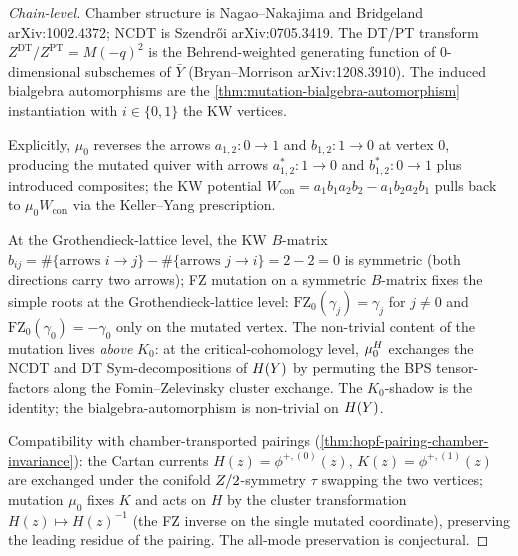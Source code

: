 \begin{proof}[Chain-level]
  Chamber structure is Nagao--Nakajima \cite[Thm 3.5, \S 4]{NagaoNakajima2011}
  and Bridgeland \cite[Thm 1.2]{Bridgeland2011} arXiv:1002.4372; NCDT is
  Szendr\H{o}i \cite{Szendroi2008} arXiv:0705.3419. The DT/PT transform
  $Z^{\mathrm{DT}}/Z^{\mathrm{PT}} = M(-q)^2$ is the Behrend-weighted generating
  function of $0$-dimensional subschemes of $\bar{Y}$
  (Bryan--Morrison \cite{BryanMorrison2012} arXiv:1208.3910). The
  induced bialgebra automorphisms are the
  \cref{thm:mutation-bialgebra-automorphism} instantiation with
  $i \in \{0, 1\}$ the KW vertices.

  Explicitly, $\mu_0$ reverses the arrows $a_{1,2}\colon 0 \to 1$ and
  $b_{1,2}\colon 1 \to 0$ at vertex $0$, producing the mutated quiver
  with arrows $a_{1,2}^*\colon 1 \to 0$ and $b_{1,2}^*\colon 0 \to 1$
  plus introduced composites; the KW potential
  $W_{\mathrm{con}} = a_1 b_1 a_2 b_2 - a_1 b_2 a_2 b_1$ pulls back to
  $\mu_0 W_{\mathrm{con}}$ via the Keller--Yang prescription.

  At the Grothendieck-lattice level, the KW $B$-matrix
  $b_{ij} = \#\{\text{arrows } i \to j\} - \#\{\text{arrows } j \to i\} = 2 - 2 = 0$
  is symmetric (both directions carry two arrows); FZ mutation
  on a symmetric $B$-matrix fixes the simple roots at the Grothendieck-lattice
  level: $\mathrm{FZ}_0(\gamma_j) = \gamma_j$ for $j \neq 0$ and
  $\mathrm{FZ}_0(\gamma_0) = -\gamma_0$ only on the mutated vertex. The
  non-trivial content of the mutation lives \emph{above} $K_0$: at the
  critical-cohomology level, $\mu_0^{H}$ exchanges the NCDT and DT
  Sym-decompositions of $H(Y)$ by permuting the BPS
  tensor-factors along the Fomin--Zelevinsky cluster exchange. The
  $K_0$-shadow is the identity; the bialgebra-automorphism is
  non-trivial on $H(Y)$.

  Compatibility with chamber-transported pairings
  (\cref{thm:hopf-pairing-chamber-invariance}): the Cartan currents
  $H(z) = \phi^{+,(0)}(z)$, $K(z) = \phi^{+,(1)}(z)$ are exchanged
  under the conifold $Z/2$-symmetry $\tau$ swapping the two vertices;
  mutation $\mu_0$ fixes $K$ and acts on $H$ by the cluster
  transformation $H(z) \mapsto H(z)^{-1}$ (the FZ inverse on the
  single mutated coordinate), preserving the leading residue of the
  pairing. The all-mode preservation is conjectural.
\end{proof}

